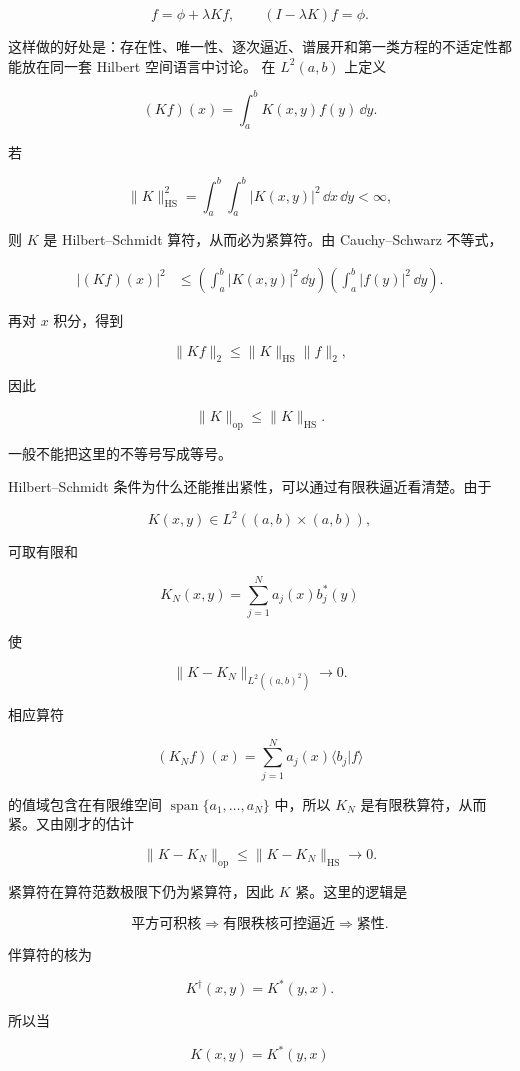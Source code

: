 \[
f=\phi+\lambda Kf,
\qquad
(I-\lambda K)f=\phi.
\]

这样做的好处是：存在性、唯一性、逐次逼近、谱展开和第一类方程的不适定性都能放在同一套 Hilbert 空间语言中讨论。
在 $L^2(a,b)$ 上定义

\[
(Kf)(x)=\int_a^b K(x,y)f(y)\,\dd y.
\]

若

\[
\|K\|_{\mathrm{HS}}^2
=\int_a^b\int_a^b|K(x,y)|^2\,\dd x\,\dd y<\infty,
\]

则 $K$ 是 Hilbert--Schmidt 算符，从而必为紧算符。由 Cauchy--Schwarz 不等式，

\[
\begin{aligned}
|(Kf)(x)|^2
&\le \left(\int_a^b|K(x,y)|^2\,\dd y\right)
\left(\int_a^b|f(y)|^2\,\dd y\right).
\end{aligned}
\]

再对 $x$ 积分，得到

\[
\|Kf\|_2\le \|K\|_{\mathrm{HS}}\|f\|_2,
\]

因此

\[
\boxed{\|K\|_{\mathrm{op}}\le\|K\|_{\mathrm{HS}}}.
\]

一般不能把这里的不等号写成等号。

Hilbert--Schmidt 条件为什么还能推出紧性，可以通过有限秩逼近看清楚。由于

\[
K(x,y)\in L^2((a,b)\times(a,b)),
\]

可取有限和

\[
K_N(x,y)=\sum_{j=1}^{N}a_j(x)b_j^*(y)
\]

使

\[
\|K-K_N\|_{L^2((a,b)^2)}\to0.
\]

相应算符

\[
(K_Nf)(x)
=\sum_{j=1}^{N}a_j(x)\langle b_j|f\rangle
\]

的值域包含在有限维空间 $\operatorname{span}\{a_1,\ldots,a_N\}$ 中，所以 $K_N$ 是有限秩算符，从而紧。又由刚才的估计

\[
\|K-K_N\|_{\mathrm{op}}
\le\|K-K_N\|_{\mathrm{HS}}\to0.
\]

紧算符在算符范数极限下仍为紧算符，因此 $K$ 紧。这里的逻辑是

\[
\text{平方可积核}
\Rightarrow\text{有限秩核可控逼近}
\Rightarrow\text{紧性}.
\]

伴算符的核为

\[
K^\dagger(x,y)=K^*(y,x).
\]

所以当

\[
K(x,y)=K^*(y,x)
\]

